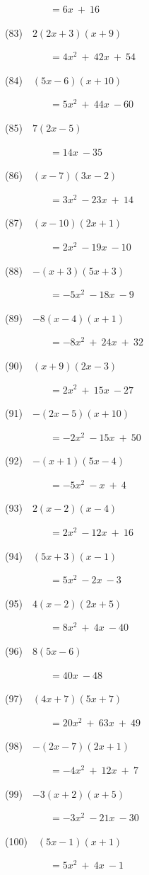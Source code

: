 \documentclass[a4j,twocolumn,10pt,fleqn]{jarticle}
\begin{document}
~~~~~~~~~$=6x~+~16$

(83)~~$2(2x+3)(x+9)$

~~~~~~~~~$=4x^2~+~42x~+~54$

(84)~~$(5x-6)(x+10)$

~~~~~~~~~$=5x^2~+~44x~-60$

(85)~~$7(2x-5)$

~~~~~~~~~$=14x~-35$

(86)~~$(x-7)(3x-2)$

~~~~~~~~~$=3x^2~-23x~+~14$

(87)~~$(x-10)(2x+1)$

~~~~~~~~~$=2x^2~-19x~-10$

(88)~~$-(x+3)(5x+3)$

~~~~~~~~~$=-5x^2~-18x~-9$

(89)~~$-8(x-4)(x+1)$

~~~~~~~~~$=-8x^2~+~24x~+~32$

(90)~~$(x+9)(2x-3)$

~~~~~~~~~$=2x^2~+~15x~-27$

(91)~~$-(2x-5)(x+10)$

~~~~~~~~~$=-2x^2~-15x~+~50$

(92)~~$-(x+1)(5x-4)$

~~~~~~~~~$=-5x^2~-x~+~4$

(93)~~$2(x-2)(x-4)$

~~~~~~~~~$=2x^2~-12x~+~16$

(94)~~$(5x+3)(x-1)$

~~~~~~~~~$=5x^2~-2x~-3$

(95)~~$4(x-2)(2x+5)$

~~~~~~~~~$=8x^2~+~4x~-40$

(96)~~$8(5x-6)$

~~~~~~~~~$=40x~-48$

(97)~~$(4x+7)(5x+7)$

~~~~~~~~~$=20x^2~+~63x~+~49$

(98)~~$-(2x-7)(2x+1)$

~~~~~~~~~$=-4x^2~+~12x~+~7$

(99)~~$-3(x+2)(x+5)$

~~~~~~~~~$=-3x^2~-21x~-30$

(100)~~$(5x-1)(x+1)$

~~~~~~~~~$=5x^2~+~4x~-1$
\end{document}
